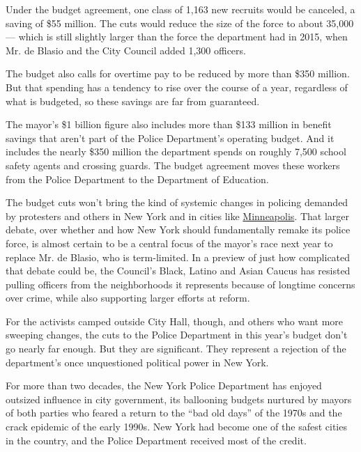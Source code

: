 Under the budget agreement, one class of 1,163 new recruits would be
canceled, a saving of \$55 million. The cuts would reduce the size of
the force to about 35,000 --- which is still slightly larger than the
force the department had in 2015, when Mr. de Blasio and the City
Council added 1,300 officers.

The budget also calls for overtime pay to be reduced by more than \$350
million. But that spending has a tendency to rise over the course of a
year, regardless of what is budgeted, so these savings are far from
guaranteed.

The mayor's \$1 billion figure also includes more than \$133 million in
benefit savings that aren't part of the Police Department's operating
budget. And it includes the nearly \$350 million the department spends
on roughly 7,500 school safety agents and crossing guards. The budget
agreement moves these workers from the Police Department to the
Department of Education.

The budget cuts won't bring the kind of systemic changes in policing
demanded by protesters and others in New York and in cities like
\href{https://www.nytimes3xbfgragh.onion/2020/06/07/us/minneapolis-police-abolish.html}{Minneapolis}.
That larger debate, over whether and how New York should fundamentally
remake its police force, is almost certain to be a central focus of the
mayor's race next year to replace Mr. de Blasio, who is term-limited. In
a preview of just how complicated that debate could be, the Council's
Black, Latino and Asian Caucus has resisted pulling officers from the
neighborhoods it represents because of longtime concerns over crime,
while also supporting larger efforts at reform.

For the activists camped outside City Hall, though, and others who want
more sweeping changes, the cuts to the Police Department in this year's
budget don't go nearly far enough. But they are significant. They
represent a rejection of the department's once unquestioned political
power in New York.

For more than two decades, the New York Police Department has enjoyed
outsized influence in city government, its ballooning budgets nurtured
by mayors of both parties who feared a return to the ``bad old days'' of
the 1970s and the crack epidemic of the early 1990s. New York had become
one of the safest cities in the country, and the Police Department
received most of the credit.

